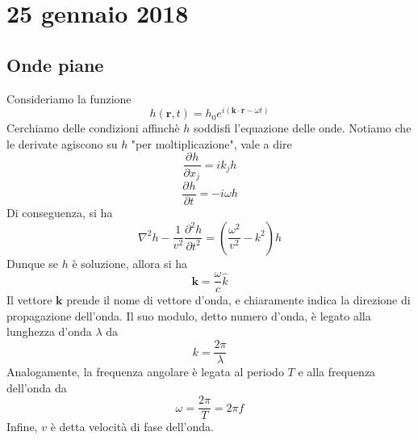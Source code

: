 \documentclass[a4paper,11pt]{book}
\newcommand{\der}[3][]{\frac{\partial ^{#1}#2}{\partial {#3}^{#1}}}
\let\oldnabla\nabla
\renewcommand{\nabla}{\vec{\oldnabla}}
\newcommand{\lap}{\oldnabla^2}
\renewcommand{\vec}[1]{\mathbf{#1}}
\theoremstyle{theorem}
\theoremstyle{definition}
\begin{document}
\section{25 gennaio 2018}
\subsection{Onde piane}
Consideriamo la funzione
\[h(\vec{r},t)=h_0e^{i(\vec{k}\cdot\vec{r}-\omega t)}\]
Cerchiamo delle condizioni affinchè $h$ soddisfi l'equazione delle onde. Notiamo che le derivate agiscono su $h$ "per moltiplicazione", vale a dire
\[\der{h}{x_j}=ik_jh\]
\[\der{h}{t}=-i\omega h\]
Di conseguenza, si ha
\[\lap h-\frac{1}{v^2}\der[2]{h}{t}=\left(\frac{\omega^2}{v^2}-k^2\right)h\]
Dunque se $h$ è soluzione, allora si ha
\[\vec{k}=\frac{\omega}{c}\hat{k}\]
Il vettore $\vec{k}$ prende il nome di vettore d'onda, e chiaramente indica la direzione di propagazione dell'onda. Il suo modulo, detto numero d'onda, è legato alla lunghezza d'onda $\lambda$ da
\[k=\frac{2\pi}{\lambda}\]
Analogamente, la frequenza angolare è legata al periodo $T$ e alla frequenza dell'onda da
\[\omega=\frac{2\pi}{T}=2\pi f\]
Infine, $v$ è detta velocità di fase dell'onda.
\end{document}
